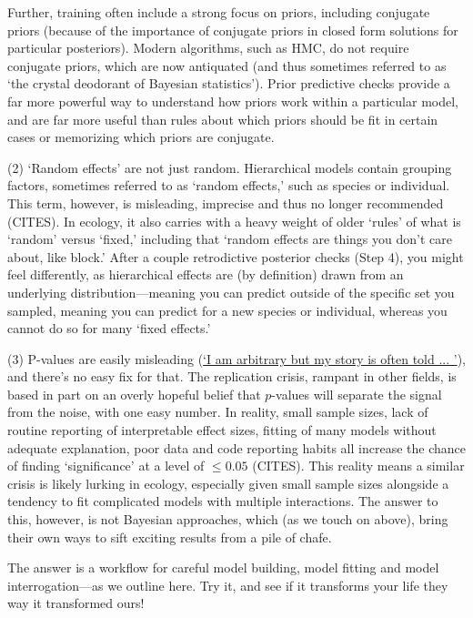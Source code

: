\documentclass[11pt]{article}
\begin{document}
Further, training often include a strong focus on priors, including conjugate priors (because of the importance of conjugate priors in closed form solutions for particular posteriors). Modern algorithms, such as HMC, do not require conjugate priors, which are now antiquated (and thus sometimes referred to as  `the crystal deodorant of Bayesian statistics'). Prior predictive checks provide a far more powerful way to understand how priors work within a particular model, and are far more useful than rules about which priors should be fit in certain cases or memorizing which priors are conjugate. 

(2) `Random effects' are not just random. Hierarchical models contain grouping factors, sometimes referred to as `random effects,' such as species or individual. This term, however, is misleading, imprecise and thus no longer recommended (CITES). In ecology, it also carries with a heavy weight of older `rules' of what is `random' versus `fixed,' including that `random effects are things you don't care about, like block.' After a couple retrodictive posterior checks (Step 4), you might feel differently, as hierarchical effects are (by definition) drawn from an underlying distribution---meaning you can predict outside of the specific set you sampled, meaning you can predict for a new species or individual, whereas you cannot do so for many `fixed effects.' 

(3) P-values are easily misleading (\href{https://www.youtube.com/watch?v=c3hxhv0lpI0}{`I am arbitrary but my story is often told ... '}), and there's no easy fix for that. The replication crisis, rampant in other fields, is based in part on an overly hopeful belief that $p$-values will separate the signal from the noise, with one easy number. In reality, small sample sizes, lack of routine reporting of interpretable effect sizes, fitting of many models without adequate explanation, poor data and code reporting habits all increase the chance of finding `significance' at a level of $\le0.05$ (CITES). This reality means a similar crisis is likely lurking in ecology, especially given small sample sizes alongside a tendency to fit complicated models with multiple interactions. The answer to this, however, is not Bayesian approaches, which (as we touch on above), bring their own ways to sift exciting results from a pile of chafe. 

The answer is a workflow for careful model building, model fitting and model interrogation---as we outline here. Try it, and see if it transforms your life they way it transformed ours!
\end{document}
